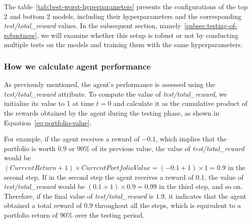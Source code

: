 \documentclass[../xlapes02]{subfiles}
\begin{document}
    The table~\cref{tab:best-worst-hyperparameters} presents the configurations of the top 2 and bottom 2 models, including their hyperparameters and the corresponding \emph{test/total\_reward} values. In the subsequent section, namely~\cref{subsec:testing-of-robustness}, we will examine whether this setup is robust or not by conducting multiple tests on the models and training them with the same hyperparameters.

    \subsubsection{How we calculate agent performance}\label{subsubsec:how_we_calculate_agent_performance}
    As previously mentioned, the agent's performance is assessed using the \emph{test/total\_reward} attribute. To compute the value of \emph{test/total\_reward}, we initialize its value to 1 at time $t=0$ and calculate it as the cumulative product of the rewards obtained by the agent during the testing phase, as shown in Equation~\cref{eq:portfolio-value}.

    For example, if the agent receives a reward of $-0.1$, which implies that the portfolio is worth $0.9$ or $90\%$ of its previous value, the value of \emph{test/total\_reward} would be $(CurrentReturn+1)\times CurrentPortfolioValue = (-0.1+1)\times 1 = 0.9$ in the second step. If in the second step the agent receives a reward of $0.1$, the value of \emph{test/total\_reward} would be $(0.1+1) \times 0.9 = 0.99$ in the third step, and so on. Therefore, if the final value of \emph{test/total\_reward} is $1.9$, it indicates that the agent obtained a total reward of $0.9$ throughout all the steps, which is equivalent to a portfolio return of $90\%$ over the testing period.

\end{document}
